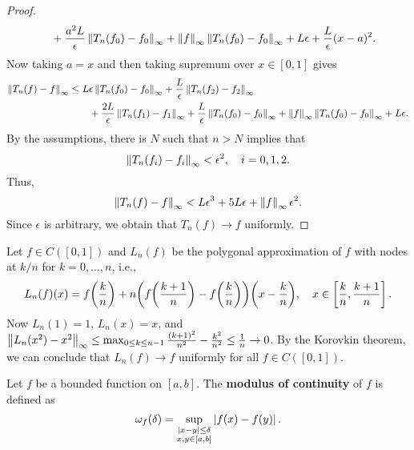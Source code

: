 \begin{proof}
\begin{equation*}
\begin{split}
            &\qquad + \frac{a^2L}{\epsilon}\left\lVert {T_n(f_0) - f_0} \right\rVert_\infty + \left\lVert {f} \right\rVert_\infty\left\lVert {T_n(f_0) - f_0} \right\rVert_\infty + L\epsilon + \frac{L}{\epsilon}(x-a)^2.
        \end{split}
    \end{equation*}
    Now taking $a = x$ and then taking supremum over $x\in[0,1]$ gives
    \begin{equation*}
        \begin{split}
            \left\lVert {T_n(f) - f} \right\rVert_\infty &\leq L\epsilon\left\lVert {T_n(f_0) - f_0} \right\rVert_\infty + \frac{L}{\epsilon}\left\lVert {T_n(f_2) - f_2} \right\rVert_\infty \\
            &\qquad + \frac{2L}{\epsilon}\left\lVert {T_n(f_1) - f_1} \right\rVert_\infty + \frac{L}{\epsilon}\left\lVert {T_n(f_0) - f_0} \right\rVert_\infty + \left\lVert {f} \right\rVert_\infty\left\lVert {T_n(f_0) - f_0} \right\rVert_\infty + L\epsilon.
        \end{split}
    \end{equation*}
    By the assumptions, there is $N$ such that $n>N$ implies that 
    \begin{equation*}
        \left\lVert {T_n(f_i) - f_i} \right\rVert_\infty < \epsilon^2, \quad i = 0,1,2.
    \end{equation*}
    Thus, 
    \begin{equation*}
        \left\lVert {T_n(f) - f} \right\rVert_\infty < L\epsilon^3 + 5L\epsilon + \left\lVert {f} \right\rVert_\infty\epsilon^2.
    \end{equation*}
    Since $\epsilon$ is arbitrary, we obtain that $T_n(f)\to f$ uniformly.
\end{proof}

\begin{example}
    Let $f\in C([0,1])$ and $L_n(f)$ be the polygonal approximation of $f$ with 
    nodes at $k/n$ for $k = 0,\ldots,n$, i.e., 
    \begin{equation*}
        L_n(f)(x) = f\pth{\frac{k}{n}} + n\pth{f\pth{\frac{k+1}{n}} - f\pth{\frac{k}{n}}}\pth{x - \frac{k}{n}}, \quad x\in\sbrc{\frac{k}{n},\frac{k+1}{n}}.
    \end{equation*}
    Now $L_n(1) = 1$, $L_n(x) = x$, and $\left\lVert {L_n(x^2) - x^2} \right\rVert_\infty \leq \max_{0\leq k\leq n-1} \frac{(k+1)^2}{n^2} - \frac{k^2}{n^2} \leq \frac{1}{n}\to 0$. 
    By the Korovkin theorem, we can conclude that $L_n(f)\to f$ uniformly for 
    all $f\in C([0,1])$.
\end{example}

\begin{definition}
    Let $f$ be a bounded function on $[a,b]$. The \textbf{modulus of continuity} 
    of $f$ is defined as 
    \begin{equation*}
        \omega_f(\delta) = \sup_{\substack{\left\lvert {x-y} \right\rvert\leq\delta \\ x,y\in[a,b]}}\left\lvert {f(x) - f(y)} \right\rvert.
    \end{equation*}
\end{definition}

